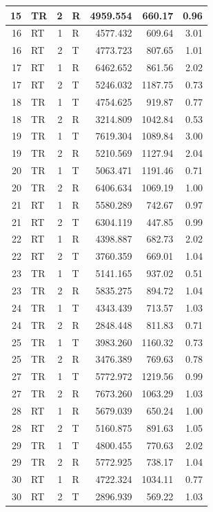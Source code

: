 \documentclass[
  12pt,
]{krantz}
\begin{document}
\begin{table}
\begin{tabular}[t]{r|l|r|l|r|r|r}
\hline
15 & TR & 2 & R & 4959.554 & 660.17 & 0.96\\
\hline
16 & RT & 1 & R & 4577.432 & 609.64 & 3.01\\
\hline
16 & RT & 2 & T & 4773.723 & 807.65 & 1.01\\
\hline
17 & RT & 1 & R & 6462.652 & 861.56 & 2.02\\
\hline
17 & RT & 2 & T & 5246.032 & 1187.75 & 0.73\\
\hline
18 & TR & 1 & T & 4754.625 & 919.87 & 0.77\\
\hline
18 & TR & 2 & R & 3214.809 & 1042.84 & 0.53\\
\hline
19 & TR & 1 & T & 7619.304 & 1089.84 & 3.00\\
\hline
19 & TR & 2 & R & 5210.569 & 1127.94 & 2.04\\
\hline
20 & TR & 1 & T & 5063.471 & 1191.46 & 0.71\\
\hline
20 & TR & 2 & R & 6406.634 & 1069.19 & 1.00\\
\hline
21 & RT & 1 & R & 5580.289 & 742.67 & 0.97\\
\hline
21 & RT & 2 & T & 6304.119 & 447.85 & 0.99\\
\hline
22 & RT & 1 & R & 4398.887 & 682.73 & 2.02\\
\hline
22 & RT & 2 & T & 3760.359 & 669.01 & 1.04\\
\hline
23 & TR & 1 & T & 5141.165 & 937.02 & 0.51\\
\hline
23 & TR & 2 & R & 5835.275 & 894.72 & 1.04\\
\hline
24 & TR & 1 & T & 4343.439 & 713.57 & 1.03\\
\hline
24 & TR & 2 & R & 2848.448 & 811.83 & 0.71\\
\hline
25 & TR & 1 & T & 3983.260 & 1160.32 & 0.73\\
\hline
25 & TR & 2 & R & 3476.389 & 769.63 & 0.78\\
\hline
27 & TR & 1 & T & 5772.972 & 1219.56 & 0.99\\
\hline
27 & TR & 2 & R & 7673.260 & 1063.29 & 1.03\\
\hline
28 & RT & 1 & R & 5679.039 & 650.24 & 1.00\\
\hline
28 & RT & 2 & T & 5160.875 & 891.63 & 1.05\\
\hline
29 & TR & 1 & T & 4800.455 & 770.63 & 2.02\\
\hline
29 & TR & 2 & R & 5772.925 & 738.17 & 1.04\\
\hline
30 & RT & 1 & R & 4722.324 & 1034.11 & 0.77\\
\hline
30 & RT & 2 & T & 2896.939 & 569.22 & 1.03\\

\end{tabular}
\end{table}
\end{document}
